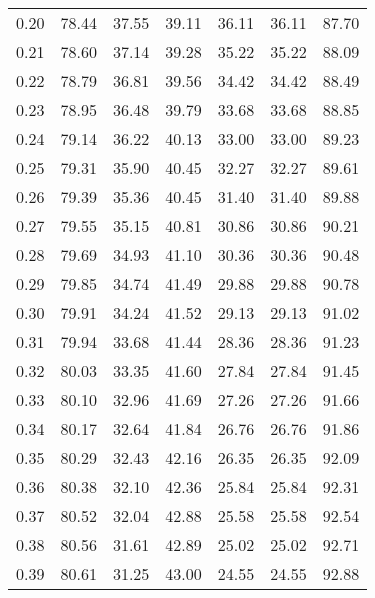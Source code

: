 \begin{tabular}{|c|c|c|c|c|c|c|}
      0.20 &     78.44 &     37.55 &      39.11 &   36.11 &      36.11 &         87.70 \\
      0.21 &     78.60 &     37.14 &      39.28 &   35.22 &      35.22 &         88.09 \\
      0.22 &     78.79 &     36.81 &      39.56 &   34.42 &      34.42 &         88.49 \\
      0.23 &     78.95 &     36.48 &      39.79 &   33.68 &      33.68 &         88.85 \\
      0.24 &     79.14 &     36.22 &      40.13 &   33.00 &      33.00 &         89.23 \\
      0.25 &     79.31 &     35.90 &      40.45 &   32.27 &      32.27 &         89.61 \\
      0.26 &     79.39 &     35.36 &      40.45 &   31.40 &      31.40 &         89.88 \\
      0.27 &     79.55 &     35.15 &      40.81 &   30.86 &      30.86 &         90.21 \\
      0.28 &     79.69 &     34.93 &      41.10 &   30.36 &      30.36 &         90.48 \\
      0.29 &     79.85 &     34.74 &      41.49 &   29.88 &      29.88 &         90.78 \\
      0.30 &     79.91 &     34.24 &      41.52 &   29.13 &      29.13 &         91.02 \\
      0.31 &     79.94 &     33.68 &      41.44 &   28.36 &      28.36 &         91.23 \\
      0.32 &     80.03 &     33.35 &      41.60 &   27.84 &      27.84 &         91.45 \\
      0.33 &     80.10 &     32.96 &      41.69 &   27.26 &      27.26 &         91.66 \\
      0.34 &     80.17 &     32.64 &      41.84 &   26.76 &      26.76 &         91.86 \\
      0.35 &     80.29 &     32.43 &      42.16 &   26.35 &      26.35 &         92.09 \\
      0.36 &     80.38 &     32.10 &      42.36 &   25.84 &      25.84 &         92.31 \\
      0.37 &     80.52 &     32.04 &      42.88 &   25.58 &      25.58 &         92.54 \\
      0.38 &     80.56 &     31.61 &      42.89 &   25.02 &      25.02 &         92.71 \\
      0.39 &     80.61 &     31.25 &      43.00 &   24.55 &      24.55 &         92.88 \\

\end{tabular}
